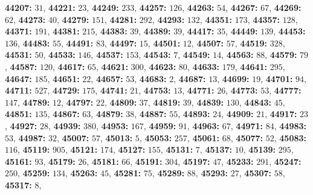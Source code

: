 \textsf{\bfseries 44207:} $31$, \textsf{\bfseries 44221:} $23$, \textsf{\bfseries 44249:} $233$, \textsf{\bfseries 44257:} $126$, \textsf{\bfseries 44263:} $54$, \textsf{\bfseries 44267:} $67$, \textsf{\bfseries 44269:} $62$, \textsf{\bfseries 44273:} $40$, \textsf{\bfseries 44279:} $151$, \textsf{\bfseries 44281:} $292$, \textsf{\bfseries 44293:} $132$, \textsf{\bfseries 44351:} $173$, \textsf{\bfseries 44357:} $128$, \textsf{\bfseries 44371:} $191$, \textsf{\bfseries 44381:} $215$, \textsf{\bfseries 44383:} $39$, \textsf{\bfseries 44389:} $39$, \textsf{\bfseries 44417:} $35$, \textsf{\bfseries 44449:} $139$, \textsf{\bfseries 44453:} $136$, \textsf{\bfseries 44483:} $55$, \textsf{\bfseries 44491:} $83$, \textsf{\bfseries 44497:} $15$, \textsf{\bfseries 44501:} $12$, \textsf{\bfseries 44507:} $57$, \textsf{\bfseries 44519:} $328$, \textsf{\bfseries 44531:} $50$, \textsf{\bfseries 44533:} $146$, \textsf{\bfseries 44537:} $153$, \textsf{\bfseries 44543:} $7$, \textsf{\bfseries 44549:} $14$, \textsf{\bfseries 44563:} $88$, \textsf{\bfseries 44579:} $79$, \textsf{\bfseries 44587:} $120$, \textsf{\bfseries 44617:} $65$, \textsf{\bfseries 44621:} $300$, \textsf{\bfseries 44623:} $80$, \textsf{\bfseries 44633:} $179$, \textsf{\bfseries 44641:} $295$, \textsf{\bfseries 44647:} $185$, \textsf{\bfseries 44651:} $22$, \textsf{\bfseries 44657:} $53$, \textsf{\bfseries 44683:} $2$, \textsf{\bfseries 44687:} $13$, \textsf{\bfseries 44699:} $19$, \textsf{\bfseries 44701:} $94$, \textsf{\bfseries 44711:} $527$, \textsf{\bfseries 44729:} $175$, \textsf{\bfseries 44741:} $21$, \textsf{\bfseries 44753:} $13$, \textsf{\bfseries 44771:} $26$, \textsf{\bfseries 44773:} $53$, \textsf{\bfseries 44777:} $147$, \textsf{\bfseries 44789:} $12$, \textsf{\bfseries 44797:} $22$, \textsf{\bfseries 44809:} $37$, \textsf{\bfseries 44819:} $39$, \textsf{\bfseries 44839:} $130$, \textsf{\bfseries 44843:} $45$, \textsf{\bfseries 44851:} $135$, \textsf{\bfseries 44867:} $63$, \textsf{\bfseries 44879:} $38$, \textsf{\bfseries 44887:} $55$, \textsf{\bfseries 44893:} $24$, \textsf{\bfseries 44909:} $21$, \textsf{\bfseries 44917:} $23$, \textsf{\bfseries 44927:} $28$, \textsf{\bfseries 44939:} $380$, \textsf{\bfseries 44953:} $167$, \textsf{\bfseries 44959:} $91$, \textsf{\bfseries 44963:} $67$, \textsf{\bfseries 44971:} $84$, \textsf{\bfseries 44983:} $53$, \textsf{\bfseries 44987:} $32$, \textsf{\bfseries 45007:} $57$, \textsf{\bfseries 45013:} $5$, \textsf{\bfseries 45053:} $257$, \textsf{\bfseries 45061:} $68$, \textsf{\bfseries 45077:} $52$, \textsf{\bfseries 45083:} $116$, \textsf{\bfseries 45119:} $905$, \textsf{\bfseries 45121:} $174$, \textsf{\bfseries 45127:} $155$, \textsf{\bfseries 45131:} $7$, \textsf{\bfseries 45137:} $10$, \textsf{\bfseries 45139:} $295$, \textsf{\bfseries 45161:} $93$, \textsf{\bfseries 45179:} $26$, \textsf{\bfseries 45181:} $66$, \textsf{\bfseries 45191:} $304$, \textsf{\bfseries 45197:} $47$, \textsf{\bfseries 45233:} $291$, \textsf{\bfseries 45247:} $250$, \textsf{\bfseries 45259:} $134$, \textsf{\bfseries 45263:} $45$, \textsf{\bfseries 45281:} $75$, \textsf{\bfseries 45289:} $88$, \textsf{\bfseries 45293:} $27$, \textsf{\bfseries 45307:} $58$, \textsf{\bfseries 45317:} $8$, 
